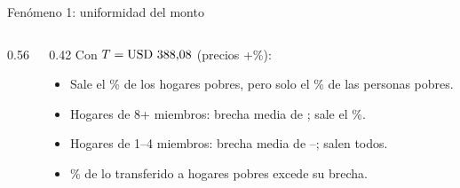 \documentclass[aspectratio=169,11pt]{beamer}
\newcommand{\usd}[1]{\text{USD~#1}}
\begin{document}
\begin{frame}{Fenómeno 1: uniformidad del monto}
  \begin{columns}[c]
    \begin{column}{0.56\textwidth}
    \end{column}
    \begin{column}{0.42\textwidth}\footnotesize
      Con $T = \usd{\cMonto}$ (precios +\cDefInfl\%):
      \begin{itemize}
        \item Sale el \cSalenHog\% de los hogares pobres, pero solo el \cSalenPer\% de las personas pobres.
        \item Hogares de 8+ miembros: brecha media de \usd{\cTamBrechaH}; sale el \cTamSalenH\%.
        \item Hogares de 1--4 miembros: brecha media de \usd{\cTamBrechaA}--\cTamBrechaD; salen todos.
        \item \alert{\cSobrepago\%} de lo transferido a hogares pobres excede su brecha.
      \end{itemize}
    \end{column}
  \end{columns}
\end{frame}
\end{document}
